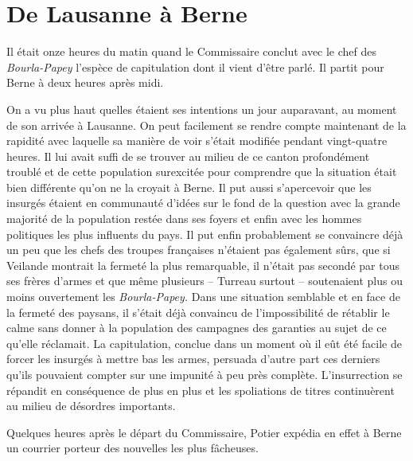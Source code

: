 \documentclass[french,twoside]{book} %
\begin{document}
\section[{De Lausanne à Berne}]{De Lausanne à Berne}
\noindent Il était onze heures du matin quand le Commissaire conclut avec le chef des \emph{Bourla-Papey} l’espèce de capitulation dont il vient d’être parlé. Il partit pour Berne à deux heures après midi.\par
On a vu plus haut quelles étaient ses intentions un jour auparavant, au moment de son arrivée à Lausanne. On peut facilement se rendre compte maintenant de la rapidité avec laquelle sa manière de voir s’était modifiée pendant vingt-quatre heures. Il lui avait suffi de se trouver au milieu de ce canton profondément troublé et de cette population surexcitée pour comprendre que la situation était bien différente qu’on ne la croyait à Berne. Il put aussi s’apercevoir que les insurgés étaient en communauté d’idées sur le fond de la question avec la grande majorité de la population restée dans ses foyers et enfin avec les hommes politiques les plus influents du pays. Il put enfin probablement se convaincre déjà un peu que les chefs des troupes françaises n’étaient pas également sûrs, que si Veilande montrait la fermeté la plus remarquable, il n’était pas secondé par tous ses frères d’armes et que même plusieurs – Turreau surtout – soutenaient plus ou moins ouvertement les \emph{Bourla-Papey.} Dans une situation semblable et en face de la fermeté des paysans, il s’était déjà convaincu de l’impossibilité de rétablir le calme sans donner à la population des campagnes des garanties au sujet de ce qu’elle réclamait. La capitulation, conclue dans un moment où il eût été facile de forcer les insurgés à mettre bas les armes, persuada d’autre part ces derniers qu’ils pouvaient compter sur une impunité à peu près complète. L’insurrection se répandit en conséquence de plus en plus et les spoliations de titres continuèrent au milieu de désordres importants.\par
Quelques heures après le départ du Commissaire, Potier expédia en effet à Berne un courrier porteur des nouvelles les plus fâcheuses.\par
\end{document}
